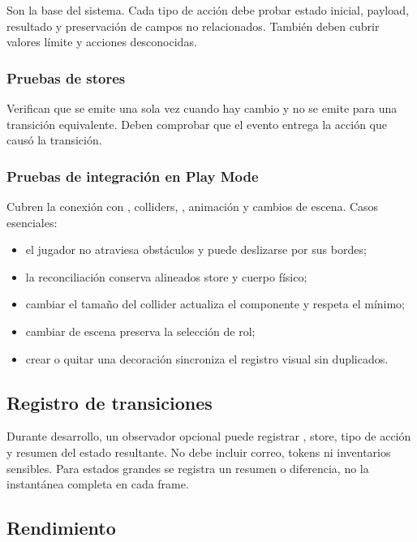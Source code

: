 Son la base del sistema. Cada tipo de acción debe probar estado inicial, payload, resultado y preservación de campos no relacionados. También deben cubrir valores límite y acciones desconocidas.

\subsubsection{Pruebas de stores}

Verifican que  se emite una sola vez cuando hay cambio y no se emite para una transición equivalente. Deben comprobar que el evento entrega la acción que causó la transición.

\subsubsection{Pruebas de integración en Play Mode}

Cubren la conexión con , colliders, , animación y cambios de escena. Casos esenciales:

\begin{itemize}
  \item el jugador no atraviesa obstáculos y puede deslizarse por sus bordes;
  \item la reconciliación conserva alineados store y cuerpo físico;
  \item cambiar el tamaño del collider actualiza el componente y respeta el mínimo;
  \item cambiar de escena preserva la selección de rol;
  \item crear o quitar una decoración sincroniza el registro visual sin duplicados.
\end{itemize}

\subsection{Registro de transiciones}

Durante desarrollo, un observador opcional puede registrar , store, tipo de acción y resumen del estado resultante. No debe incluir correo, tokens ni inventarios sensibles. Para estados grandes se registra un resumen o diferencia, no la instantánea completa en cada frame.

\subsection{Rendimiento}


